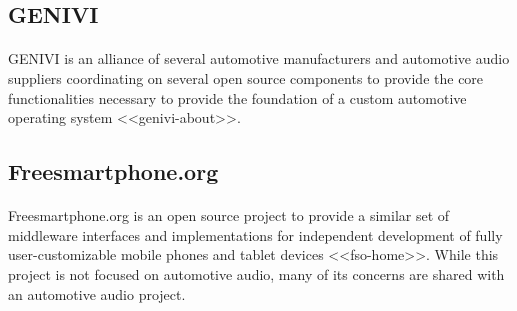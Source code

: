 \subsection{GENIVI}

\paragraph{}
GENIVI is an alliance of several automotive manufacturers and automotive audio suppliers coordinating on several open source components to provide the core functionalities necessary to provide the foundation of a custom automotive operating system <<genivi-about>>.

\subsection{Freesmartphone.org}

\paragraph{}
Freesmartphone.org is an open source project to provide a similar set of middleware interfaces and implementations for independent development of fully user-customizable mobile phones and tablet devices <<fso-home>>.
While this project is not focused on automotive audio, many of its concerns are shared with an automotive audio project.
